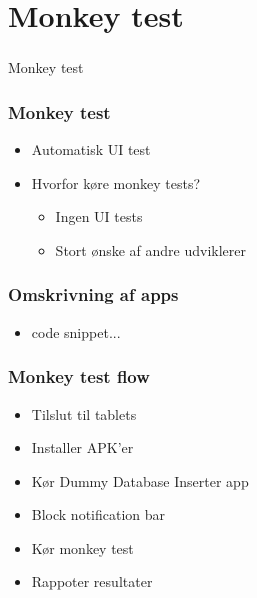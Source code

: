 \section[Monkey test]{Monkey test}
\begin{frame}
  \frametitle{}
  \begin{center}
    {\Huge Monkey test}
  \end{center}
\end{frame}

\begin{frame}
  \frametitle{Monkey test}
  \begin{itemize}
    \item Automatisk UI test
    \item Hvorfor køre monkey tests?
    \begin{itemize}
      \item Ingen UI tests
      \item Stort ønske af andre udviklerer
    \end{itemize}
  \end{itemize}
\end{frame}

\begin{frame}
  \frametitle{Omskrivning af apps}
  \begin{itemize}
    \item code snippet...
  \end{itemize}
\end{frame}



\begin{frame}
  \frametitle{Monkey test flow}
  \begin{itemize}
    \item Tilslut til tablets
    \item Installer APK'er
    \item Kør Dummy Database Inserter app
    \item Block notification bar
    \item Kør monkey test
    \item Rappoter resultater
  \end{itemize}
\end{frame}

